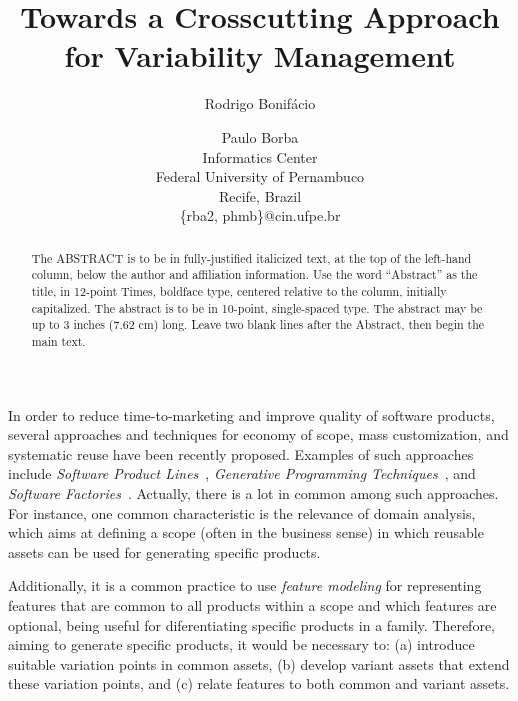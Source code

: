 \documentclass[times, 11pt,twocolumn]{article}
\begin{document}
\title{Towards a Crosscutting Approach for Variability Management}

\author{Rodrigo Bonif\'{a}cio \and Paulo Borba\\
Informatics Center \\ Federal University of Pernambuco \\ Recife, Brazil \\
\{rba2, phmb\}@cin.ufpe.br\\ }

\maketitle
\thispagestyle{empty}

\begin{abstract}
   The ABSTRACT is to be in fully-justified italicized text, at the top 
   of the left-hand column, below the author and affiliation 
   information. Use the word ``Abstract'' as the title, in 12-point 
   Times, boldface type, centered relative to the column, initially 
   capitalized. The abstract is to be in 10-point, single-spaced type. 
   The abstract may be up to 3 inches (7.62 cm) long. Leave two blank 
   lines after the Abstract, then begin the main text. 
\end{abstract}




In order to reduce time-to-marketing and improve quality of software products,
several approaches and techniques for economy of scope, mass customization, and
systematic reuse have been recently proposed. Examples of such approaches include \emph{Software Product
Lines}~\cite{Pohl:2005aa, Clements:2001aa}, \emph{Generative Programming
Techniques}~\cite{Czarnecki:2000aa}, and \emph{Software
Factories}~\cite{Greenfield:2003aa}. Actually, there is a lot in common among
such approaches. For instance, one common characteristic is the relevance of
domain analysis, which aims at defining a scope (often in the business sense)
in which reusable assets can be used for generating specific products.

Additionally, it is a common practice to use \emph{feature modeling} for
representing features that are common to all products within a scope and which
features are optional, being useful for diferentiating specific products in a
family. Therefore, aiming to generate specific products, it would be necessary
to: (a) introduce suitable variation points in common assets, (b) develop
variant assets that extend these variation points, and (c) relate features to both common and
variant assets.
\end{document}
